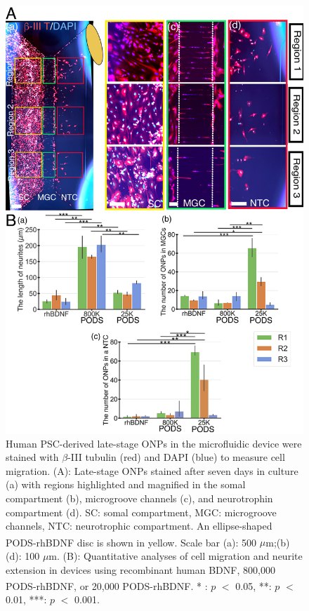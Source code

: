 \documentclass[review]{elsarticle}
\begin{document}
\begin{figure}
	\begin{center}
		\includegraphics[width=12cm]{Fig_10.jpg}
	\end{center}
	\caption{Human PSC-derived late-stage ONPs in the microfluidic device were stained with $\beta$-III tubulin (red) and DAPI (blue) to measure cell migration. (A): Late-stage ONPs stained after seven days in culture (a) with regions highlighted and magnified in the somal compartment (b), microgroove channels (c), and neurotrophin compartment (d). SC: somal compartment, MGC: microgroove channels, NTC: neurotrophic compartment. An ellipse-shaped PODS\textsuperscript{\textregistered}-rhBDNF disc is shown in yellow. Scale bar (a): 500 $\mu$m;(b)\textendash(d): 100 $\mu$m. (B): Quantitative analyses of cell migration and neurite extension in devices using recombinant human BDNF, 800,000 PODS\textsuperscript{\textregistered}-rhBDNF, or 20,000 PODS\textsuperscript{\textregistered}-rhBDNF. * : $p$ $<$ 0.05, **: $p$ $<$ 0.01, ***: $p$ $<$ 0.001.}
\end{figure}
\end{document}
